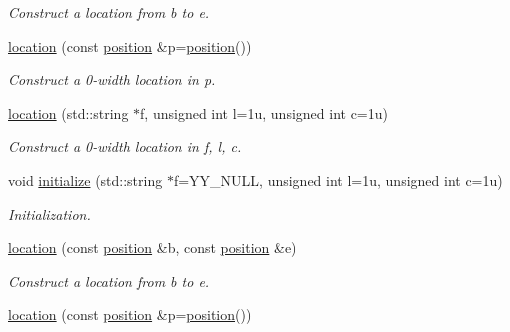 \begin{DoxyCompactItemize}
\begin{DoxyCompactList}\small\item\em Construct a location from {\itshape b} to {\itshape e}. \end{DoxyCompactList}\item 
\hypertarget{classyy_1_1location_a378c53e8dc67416748f0b12844919e51}{\hyperlink{classyy_1_1location_a378c53e8dc67416748f0b12844919e51}{location} (const \hyperlink{classyy_1_1position}{position} \&p=\hyperlink{classyy_1_1position}{position}())}\label{classyy_1_1location_a378c53e8dc67416748f0b12844919e51}

\begin{DoxyCompactList}\small\item\em Construct a 0-\/width location in {\itshape p}. \end{DoxyCompactList}\item 
\hypertarget{classyy_1_1location_a75594362f84338b764164cd632ee7d9e}{\hyperlink{classyy_1_1location_a75594362f84338b764164cd632ee7d9e}{location} (std\-::string $\ast$f, unsigned int l=1u, unsigned int c=1u)}\label{classyy_1_1location_a75594362f84338b764164cd632ee7d9e}

\begin{DoxyCompactList}\small\item\em Construct a 0-\/width location in {\itshape f}, {\itshape l}, {\itshape c}. \end{DoxyCompactList}\item 
\hypertarget{classyy_1_1location_a0f7f01fcb693c6ea82f4b087d77fdb38}{void \hyperlink{classyy_1_1location_a0f7f01fcb693c6ea82f4b087d77fdb38}{initialize} (std\-::string $\ast$f=Y\-Y\-\_\-\-N\-U\-L\-L, unsigned int l=1u, unsigned int c=1u)}\label{classyy_1_1location_a0f7f01fcb693c6ea82f4b087d77fdb38}

\begin{DoxyCompactList}\small\item\em Initialization. \end{DoxyCompactList}\item 
\hypertarget{classyy_1_1location_a0d659c37bcd57075c7bb25e600d3f526}{\hyperlink{classyy_1_1location_a0d659c37bcd57075c7bb25e600d3f526}{location} (const \hyperlink{classyy_1_1position}{position} \&b, const \hyperlink{classyy_1_1position}{position} \&e)}\label{classyy_1_1location_a0d659c37bcd57075c7bb25e600d3f526}

\begin{DoxyCompactList}\small\item\em Construct a location from {\itshape b} to {\itshape e}. \end{DoxyCompactList}\item 
\hypertarget{classyy_1_1location_a378c53e8dc67416748f0b12844919e51}{\hyperlink{classyy_1_1location_a378c53e8dc67416748f0b12844919e51}{location} (const \hyperlink{classyy_1_1position}{position} \&p=\hyperlink{classyy_1_1position}{position}())}\label{classyy_1_1location_a378c53e8dc67416748f0b12844919e51}


\end{DoxyCompactItemize}
